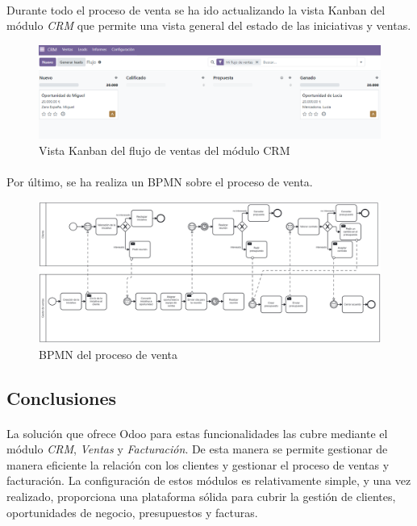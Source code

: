 \paragraph{}
Durante todo el proceso de venta se ha ido actualizando la vista Kanban del módulo \textit{CRM} que permite una vista general del estado de las iniciativas y ventas.
\begin{figure}[h]
    \centering
    \includegraphics[width=1\linewidth]{fotosRelacion/kanban.png}
    \caption{Vista Kanban del flujo de ventas del módulo CRM}
    \label{fig:enter-label}
\end{figure}
\paragraph{}
Por último, se ha realiza un BPMN sobre el proceso de venta.
\begin{figure}[h]
    \centering
    \includegraphics[width=1\linewidth]{bpmn/venta.png}
    \caption{BPMN del proceso de venta}
    \label{fig:enter-label}
\end{figure}
\subsection{Conclusiones}
\paragraph{}
La solución que ofrece Odoo para estas funcionalidades las cubre mediante el módulo \textit{CRM}, \textit{Ventas} y \textit{Facturación}. De esta manera se permite gestionar de manera eficiente la relación con los clientes y gestionar el proceso de ventas y facturación. La configuración de estos módulos es relativamente simple, y una vez realizado, proporciona una plataforma sólida para cubrir la gestión de clientes, oportunidades de negocio, presupuestos y facturas.

